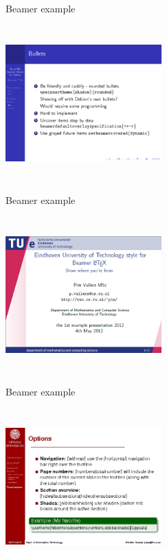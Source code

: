 \documentclass[]{beamer}
\begin{document}
\begin{frame}{Beamer example}


\centering
\includegraphics[width = 6cm, height = 6cm]{beamer2}

\end{frame}

\begin{frame}{Beamer example}


\centering
\includegraphics[width = 6cm, height = 6cm]{beamer3}

\end{frame}

\begin{frame}{Beamer example}


\centering
\includegraphics[width = 6cm, height = 6cm]{beamer4}

\end{frame}
\end{document}

